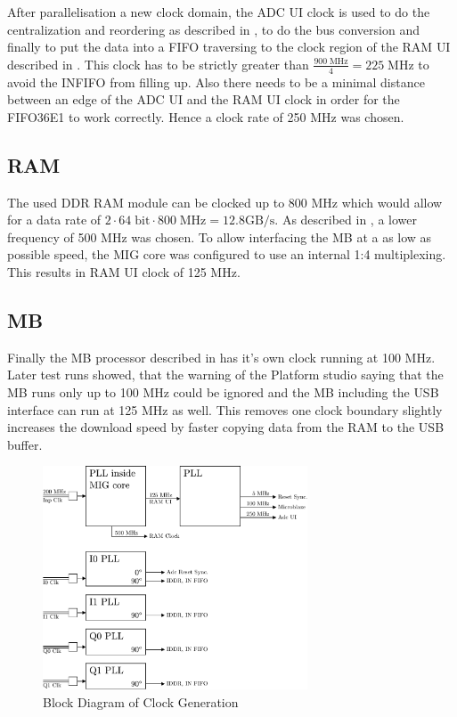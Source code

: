 After parallelisation a new clock domain, the \gls{ADC} \gls{UI} clock
is used to do the centralization and reordering as described in
,
to do the bus conversion and finally to put the data into a \gls{FIFO}
traversing to the clock region of the \gls{RAM} \gls{UI} described
in . This clock has to be strictly greater than
$\frac{900\;\text{MHz}}{4} = 225\;\text{MHz}$ to avoid the
\gls{INFIFO} from filling up. Also there needs to be a minimal
distance between an edge of the \gls{ADC} \gls{UI} and the
\gls{RAM} \gls{UI} clock in order for the FIFO36E1 to work correctly.
Hence a clock rate of 250 MHz was chosen. \\

\subsection{\gls{RAM}}
\label{sec:fpga_clock_ram}
The used \gls{DDR} \gls{RAM} module can be clocked up to 800 MHz which would
allow for a data rate of
$2 \cdot 64\;\text{bit} \cdot 800\;\text{MHz} = 12.8 \text{GB} / \text{s}$.
As described in , a lower frequency of 500 MHz
was chosen. To allow interfacing the \gls{MB} at a as low as possible speed,
the \gls{MIG} core was configured to use an internal 1:4 multiplexing. This results
in \gls{RAM} \gls{UI} clock of 125 MHz.

\subsection{\acrfull{MB}}
Finally the \gls{MB} processor described in  has
it's own clock running at 100 MHz. \\

Later test runs showed, that the warning of the Platform studio saying that the
\gls{MB} runs only up to 100 MHz could be ignored and the \gls{MB} including
the \gls{USB} interface can run at 125 MHz as well. This removes one clock boundary
slightly increases the download speed by faster copying data from the
\gls{RAM} to the \gls{USB} buffer. \\

\begin{figure}
  \centering
  \includegraphics[width=0.7\textwidth]{figures/clock_generation}
  \caption{Block Diagram of Clock Generation}
  \label{fig:fpga_clock_generation}
\end{figure}

